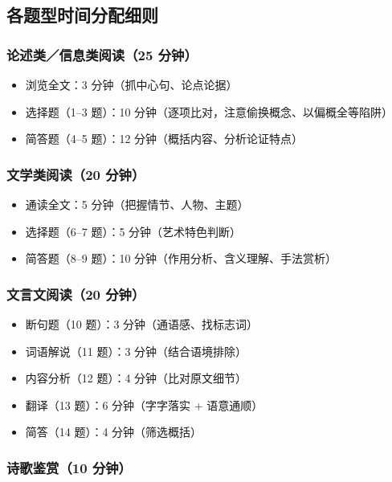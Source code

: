 \subsection{各题型时间分配细则}

\subsubsection{论述类／信息类阅读（25 分钟）}

\begin{itemize}
  \item 浏览全文：3 分钟（抓中心句、论点论据）
  \item 选择题（1--3 题）：10 分钟（逐项比对，注意偷换概念、以偏概全等陷阱）
  \item 简答题（4--5 题）：12 分钟（概括内容、分析论证特点）
\end{itemize}

\subsubsection{文学类阅读（20 分钟）}

\begin{itemize}
  \item 通读全文：5 分钟（把握情节、人物、主题）
  \item 选择题（6--7 题）：5 分钟（艺术特色判断）
  \item 简答题（8--9 题）：10 分钟（作用分析、含义理解、手法赏析）
\end{itemize}

\subsubsection{文言文阅读（20 分钟）}

\begin{itemize}
  \item 断句题（10 题）：3 分钟（通语感、找标志词）
  \item 词语解说（11 题）：3 分钟（结合语境排除）
  \item 内容分析（12 题）：4 分钟（比对原文细节）
  \item 翻译（13 题）：6 分钟（字字落实 + 语意通顺）
  \item 简答（14 题）：4 分钟（筛选概括）
\end{itemize}

\subsubsection{诗歌鉴赏（10 分钟）}

